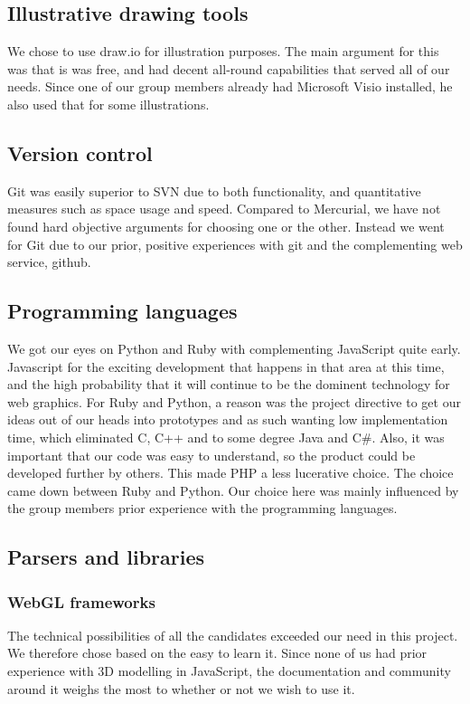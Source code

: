 \documentclass{report}
\begin{document}
\subsection{Illustrative drawing tools}
We chose to use draw.io for illustration purposes. The main argument for this was that is was free, and had decent all-round capabilities that served all of our needs. Since one of our group members already had Microsoft Visio installed, he also used that for some illustrations.
\subsection{Version control}
Git was easily superior to SVN due to both functionality, and quantitative measures such as space usage and speed. Compared to Mercurial, we have not found hard objective arguments for choosing one or the other. Instead we went for Git due to our prior, positive experiences with git and the complementing web service, github.
\subsection{Programming languages}
We got our eyes on Python and Ruby with complementing JavaScript quite early. Javascript for the exciting development that happens in that area at this time, and the high probability that it will continue to be the dominent technology for web graphics. For Ruby and Python, a reason was the project directive to get our ideas out of our heads into prototypes and as such wanting low implementation time, which eliminated C, C++ and to some degree Java and C\#. Also, it was important that our code was easy to understand, so the product could be developed further by others. This made PHP a less lucerative choice. The choice came down between Ruby and Python. Our choice here was mainly influenced by the group members prior experience with the programming languages.
\subsection{Parsers and libraries}
\subsubsection{WebGL frameworks}
The technical possibilities of all the candidates exceeded our need in this project. We therefore chose based on the easy to learn it. Since none of us had prior experience with 3D modelling in JavaScript, the documentation and community around it weighs the most to whether or not we wish to use it.
\end{document}
